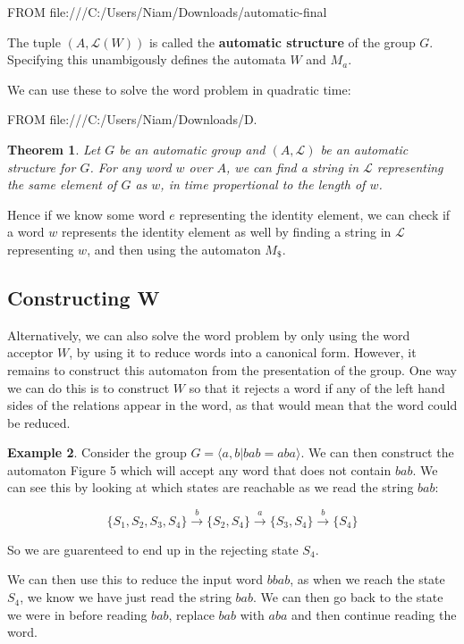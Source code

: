 \documentclass[10pt]{article}
\theoremstyle{plain}
\newtheorem{theorem}{Theorem}[section]
\theoremstyle{definition}
\newtheorem{example}[theorem]{Example}
\theoremstyle{definition}
\theoremstyle{definition}
\begin{document}
\begin{multicols}{2}
FROM file:///C:/Users/Niam/Downloads/automatic-final%

The tuple $(A, \mathcal{L}(W))$ is called the \textbf{automatic structure} of the group $G$. Specifying this unambigously defines the automata $W$ and $M_a$.

We can use these to solve the word problem in quadratic time:

FROM file:///C:/Users/Niam/Downloads/D.%

\begin{theorem}
	Let $G$ be an automatic group and $(A,\mathcal{L})$ be an automatic structure for $G$. For any word $w$ over $A$, we can find a string in $\mathcal{L}$ representing the same element of $G$ as $w$, in time propertional to the length of $w$.
\end{theorem}

Hence if we know some word $e$ representing the identity element, we can check if a word $w$ represents the identity element as well by finding a string in $\mathcal{L}$ representing $w$, and then using the automaton $M_{\$}$.

\subsection{Constructing W}

Alternatively, we can also solve the word problem by only using the word acceptor $W$, by using it to reduce words into a canonical form. However, it remains to construct this automaton from the presentation of the group. One way we can do this is to construct $W$ so that it rejects a word if any of the left hand sides of the relations appear in the word, as that would mean that the word could be reduced.

\begin{example}
	Consider the group $G = \langle a, b | bab = aba \rangle$. We can then construct the automaton Figure 5 which will accept any word that does not contain $bab$. We can see this by looking at which states are reachable as we read the string $bab$:

	$$ \{ S_1, S_2, S_3, S_4 \} \xrightarrow{b} \{ S_2, S_4 \} \xrightarrow{a} \{ S_3, S_4 \} \xrightarrow{b} \{ S_4 \} $$

	So we are guarenteed to end up in the rejecting state $S_4$.

	We can then use this to reduce the input word $bbab$, as when we reach the state $S_4$, we know we have just read the string $bab$. We can then go back to the state we were in before reading $bab$, replace $bab$ with $aba$ and then continue reading the word. 
	

\end{example}
\end{multicols}
\end{document}

